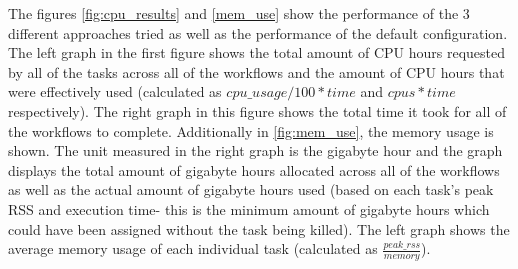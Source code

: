 The figures \ref{fig:cpu_results} and \ref{mem_use} show the performance of the 3 different approaches tried as well as the performance of the default configuration. The left graph in the first figure shows the total amount of CPU hours requested by all of the tasks across all of the workflows and the amount of CPU hours that were effectively used (calculated as $cpu\_usage/100*time$ and $cpus*time$ respectively). The right graph in this figure shows the total time it took for all of the workflows to complete. Additionally in \ref{fig:mem_use}, the memory usage is shown. The unit measured in the right graph is the gigabyte hour and the graph displays the total amount of gigabyte hours allocated across all of the workflows as well as the actual amount of gigabyte hours used (based on each task’s peak RSS and execution time- this is the minimum amount of gigabyte hours which could have been assigned without the task being killed). The left graph shows the average memory usage of each individual task (calculated as $\frac{peak\_rss}{memory}$). 

